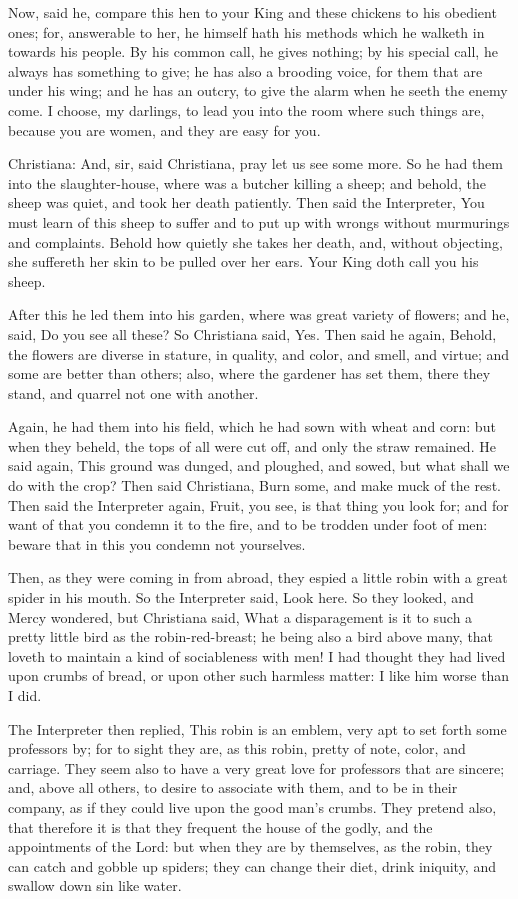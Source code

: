Now, said he, compare this hen to your King and these chickens to his obedient ones; for, answerable to her, he himself hath his methods which he walketh in towards his people. By his common call, he gives nothing; by his special call, he always has something to give; he has also a brooding voice, for them that are under his wing; and he has an outcry, to give the alarm when he seeth the enemy come. I choose, my darlings, to lead you into the room where such things are, because you are women, and they are easy for you.

Christiana: And, sir, said Christiana, pray let us see some more. So he had them into the slaughter-house, where was a butcher killing a sheep; and behold, the sheep was quiet, and took her death patiently. Then said the Interpreter, You must learn of this sheep to suffer and to put up with wrongs without murmurings and complaints. Behold how quietly she takes her death, and, without objecting, she suffereth her skin to be pulled over her ears. Your King doth call you his sheep.

After this he led them into his garden, where was great variety of flowers; and he, said, Do you see all these? So Christiana said, Yes. Then said he again, Behold, the flowers are diverse in stature, in quality, and color, and smell, and virtue; and some are better than others; also, where the gardener has set them, there they stand, and quarrel not one with another.

Again, he had them into his field, which he had sown with wheat and corn: but when they beheld, the tops of all were cut off, and only the straw remained. He said again, This ground was dunged, and ploughed, and sowed, but what shall we do with the crop? Then said Christiana, Burn some, and make muck of the rest. Then said the Interpreter again, Fruit, you see, is that thing you look for; and for want of that you condemn it to the fire, and to be trodden under foot of men: beware that in this you condemn not yourselves.

Then, as they were coming in from abroad, they espied a little robin with a great spider in his mouth. So the Interpreter said, Look here. So they looked, and Mercy wondered, but Christiana said, What a disparagement is it to such a pretty little bird as the robin-red-breast; he being also a bird above many, that loveth to maintain a kind of sociableness with men! I had thought they had lived upon crumbs of bread, or upon other such harmless matter: I like him worse than I did.

The Interpreter then replied, This robin is an emblem, very apt to set forth some professors by; for to sight they are, as this robin, pretty of note, color, and carriage. They seem also to have a very great love for professors that are sincere; and, above all others, to desire to associate with them, and to be in their company, as if they could live upon the good man's crumbs. They pretend also, that therefore it is that they frequent the house of the godly, and the appointments of the Lord: but when they are by themselves, as the robin, they can catch and gobble up spiders; they can change their diet, drink iniquity, and swallow down sin like water.

